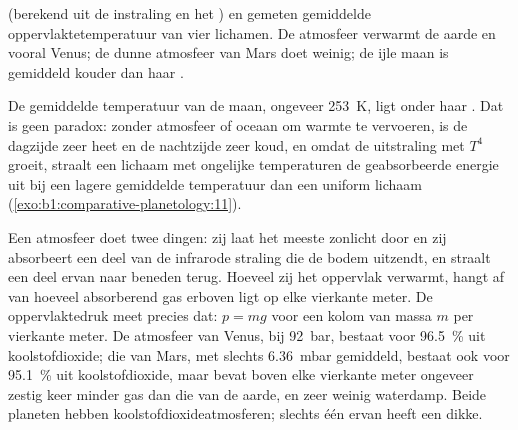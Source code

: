 \begin{omfigure}

{\small {} (berekend uit de instraling en het ) en gemeten gemiddelde
oppervlaktetemperatuur van vier lichamen. De atmosfeer verwarmt de aarde en vooral Venus; de dunne
atmosfeer van Mars doet weinig; de ijle maan is gemiddeld kouder dan haar .}
\end{omfigure}

De gemiddelde temperatuur van de maan, ongeveer \qty{253}{K}, ligt onder haar .
Dat is geen paradox: zonder atmosfeer of oceaan om warmte te vervoeren, is de dagzijde zeer heet en de
nachtzijde zeer koud, en omdat de uitstraling met $T^4$ groeit, straalt een lichaam met ongelijke
temperaturen de geabsorbeerde energie uit bij een lagere gemiddelde temperatuur dan een uniform
lichaam (\cref{exo:b1:comparative-planetology:11}).

Een atmosfeer doet twee dingen: zij laat het meeste zonlicht door en zij absorbeert een deel van de
infrarode straling die de bodem uitzendt, en straalt een deel ervan naar beneden terug. Hoeveel zij het
oppervlak verwarmt, hangt af van hoeveel absorberend gas erboven ligt op elke vierkante meter. De
oppervlaktedruk meet precies dat: $p = mg$ voor een kolom van massa $m$ per vierkante meter. De atmosfeer
van Venus, bij \qty{92}{bar}, bestaat voor \qty{96.5}{\percent} uit koolstofdioxide; die van Mars, met
slechts \qty{6.36}{mbar} gemiddeld, bestaat ook voor \qty{95.1}{\percent} uit koolstofdioxide, maar bevat
boven elke vierkante meter ongeveer zestig keer minder gas dan die van de aarde, en zeer weinig waterdamp.
Beide planeten hebben koolstofdioxideatmosferen; slechts één ervan heeft een dikke.

